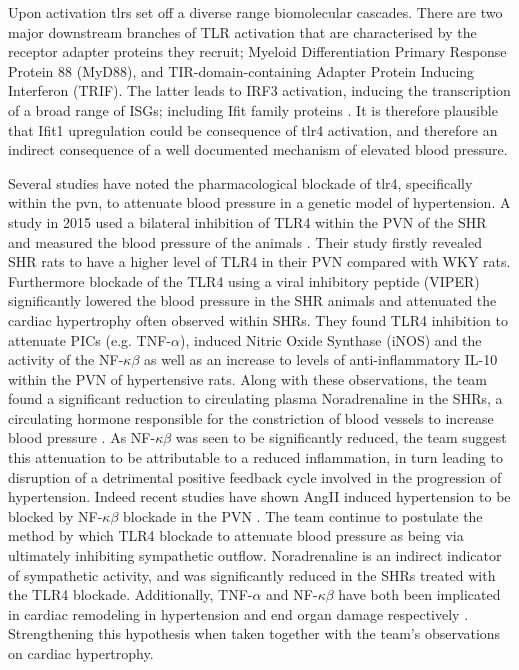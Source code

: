 Upon activation \acrshort{tlrs} set off a diverse range biomolecular cascades. There are two major downstream branches of TLR activation that are characterised by the receptor adapter proteins they recruit; Myeloid Differentiation Primary Response Protein 88 (MyD88), and TIR-domain-containing Adapter Protein Inducing Interferon (TRIF). The latter leads to IRF3 activation, inducing the transcription of a broad range of ISGs; including Ifit family proteins \cite{SCHWABE20061886,doi:10.1002/hep.22306}. It is therefore plausible that Ifit1 upregulation could be consequence of \acrshort{tlr4} activation, and therefore an indirect consequence of a well documented mechanism of elevated blood pressure. 

Several studies have noted the pharmacological blockade of \acrshort{tlr4}, specifically within the \acrshort{pvn}, to attenuate blood pressure in a genetic model of hypertension. A study in 2015 used a bilateral inhibition of TLR4 within the PVN of the SHR and measured the blood pressure of the animals \cite{Dange2015}. Their study firstly revealed SHR rats to have a higher level of TLR4 in their PVN compared with WKY rats. Furthermore blockade of the TLR4 using a viral inhibitory peptide (VIPER) significantly lowered the blood pressure in the SHR animals and attenuated the cardiac hypertrophy often observed within SHRs. They found TLR4 inhibition to attenuate PICs (e.g. TNF-$\alpha$), induced Nitric Oxide Synthase (iNOS) and the activity of the NF-$\kappa\beta$ as well as an increase to levels of anti-inflammatory IL-10 within the PVN of hypertensive rats. Along with these observations, the team found a significant reduction to circulating plasma Noradrenaline in the SHRs, a circulating hormone responsible for the constriction of blood vessels to increase blood pressure \cite{Chistiakov2015}. As NF-$\kappa\beta$ was seen to be significantly reduced, the team suggest this attenuation to be attributable to a reduced inflammation, in turn leading to disruption of a detrimental positive feedback cycle involved in the progression of hypertension. Indeed recent studies have shown AngII induced hypertension to be blocked by NF-$\kappa\beta$ blockade in the PVN \cite{Cardinale2012}. The team continue to postulate the method by which TLR4 blockade to attenuate blood pressure as being via ultimately inhibiting sympathetic outflow. Noradrenaline is an indirect indicator of sympathetic activity, and was significantly reduced in the SHRs treated with the TLR4 blockade.  Additionally, TNF-$\alpha$ and NF-$\kappa\beta$ have both been implicated in cardiac remodeling in hypertension and end organ damage respectively \cite{Fu2004,Gupta2006}. Strengthening this hypothesis when taken together with the team's observations on cardiac hypertrophy.

